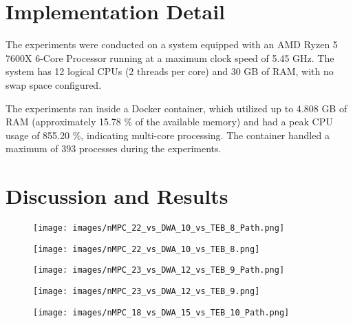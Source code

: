\documentclass[conference]{IEEEtran}
\begin{document}
\section{Implementation Detail}

The experiments were conducted on a system equipped with an AMD Ryzen 5 7600X 6-Core Processor running at a maximum clock speed of 5.45 GHz. The system has 12 logical CPUs (2 threads per core) and 30 GB of RAM, with no swap space configured.

The experiments ran inside a Docker container, which utilized up to 4.808 GB of RAM (approximately 15.78 \% of the available memory) and had a peak CPU usage of 855.20 \%, indicating multi-core processing. The container handled a maximum of 393 processes during the experiments.

\section{Discussion and Results}

\begin{figure}[!h]
    \centering
    \texttt{[image: images/nMPC\_22\_vs\_DWA\_10\_vs\_TEB\_8\_Path.png]}
    \caption{ }
    \label{fig:nMPC_22_vs_DWA_12_vs_TEB_6_Path}
\end{figure}

\begin{figure}[!h]
    \centering
    \texttt{[image: images/nMPC\_22\_vs\_DWA\_10\_vs\_TEB\_8.png]}
    \caption{ }
    \label{fig:nMPC_22_vs_DWA_12_vs_TEB_6_Path}
\end{figure}

\begin{figure}[!h]
    \centering
    \texttt{[image: images/nMPC\_23\_vs\_DWA\_12\_vs\_TEB\_9\_Path.png]}
    \caption{ }
    \label{fig:nMPC_23_vs_DWA_12_vs_TEB_6_Path}
\end{figure}

\begin{figure}[!h]
    \centering
    \texttt{[image: images/nMPC\_23\_vs\_DWA\_12\_vs\_TEB\_9.png]}
    \caption{ }
    \label{fig:nMPC_23_vs_DWA_12_vs_TEB_6_Path}
\end{figure}


\begin{figure}[!h]
    \centering
    \texttt{[image: images/nMPC\_18\_vs\_DWA\_15\_vs\_TEB\_10\_Path.png]}
    \caption{ }
    \label{fig:nMPC_16_vs_DWA_12_vs_TEB_6_Path}
\end{figure}
\end{document}
